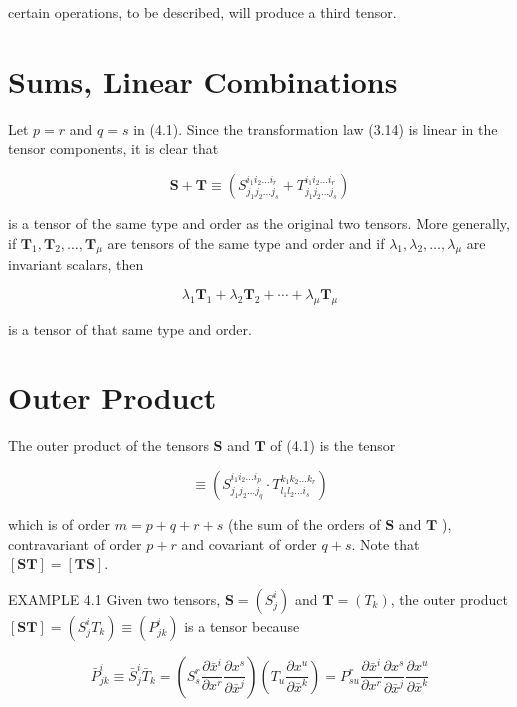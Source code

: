 \documentclass[10pt]{article}
\begin{document}
certain operations, to be described, will produce a third tensor.

\section*{Sums, Linear Combinations}
Let $p=r$ and $q=s$ in (4.1). Since the transformation law (3.14) is linear in the tensor components, it is clear that


\begin{equation*}
\mathbf{S}+\mathbf{T} \equiv\left(S_{j_{1} j_{2} \ldots j_{s}}^{i_{1} i_{2} \ldots i_{r}}+T_{j_{1} j_{2} \ldots j_{s}}^{i_{1} i_{2} \ldots i_{r}}\right) \tag{4.2a}
\end{equation*}


is a tensor of the same type and order as the original two tensors. More generally, if $\mathbf{T}_{1}, \mathbf{T}_{2}, \ldots, \mathbf{T}_{\mu}$ are tensors of the same type and order and if $\lambda_{1}, \lambda_{2}, \ldots, \lambda_{\mu}$ are invariant scalars, then


\begin{equation*}
\lambda_{1} \mathbf{T}_{1}+\lambda_{2} \mathbf{T}_{2}+\cdots+\lambda_{\mu} \mathbf{T}_{\mu} \tag{4.2b}
\end{equation*}


is a tensor of that same type and order.

\section*{Outer Product}
The outer product of the tensors $\mathbf{S}$ and $\mathbf{T}$ of (4.1) is the tensor


\begin{equation*}
[\mathbf{S T}] \equiv\left(S_{j_{1} j_{2} \ldots j_{q}}^{i_{1} i_{2} \ldots i_{p}} \cdot T_{l_{1} l_{2} \ldots i_{s}}^{k_{1} k_{2} \ldots k_{r}}\right) \tag{4.3}
\end{equation*}


which is of order $m=p+q+r+s$ (the sum of the orders of $\mathbf{S}$ and $\mathbf{T}$ ), contravariant of order $p+r$ and covariant of order $q+s$. Note that $[\mathbf{S T}]=[\mathbf{T S}]$.

EXAMPLE 4.1 Given two tensors, $\mathbf{S}=\left(S_{j}^{i}\right)$ and $\mathbf{T}=\left(T_{k}\right)$, the outer product $[\mathbf{S T}]=\left(S_{j}^{i} T_{k}\right) \equiv\left(P_{j k}^{i}\right)$ is a tensor because

$$
\bar{P}_{j k}^{i} \equiv \bar{S}_{j}^{i} \bar{T}_{k}=\left(S_{s}^{r} \frac{\partial \bar{x}^{i}}{\partial x^{r}} \frac{\partial x^{s}}{\partial \bar{x}^{j}}\right)\left(T_{u} \frac{\partial x^{u}}{\partial \bar{x}^{k}}\right)=P_{s u}^{r} \frac{\partial \bar{x}^{i}}{\partial x^{r}} \frac{\partial x^{s}}{\partial \bar{x}^{j}} \frac{\partial x^{u}}{\partial \bar{x}^{k}}
$$
\end{document}

